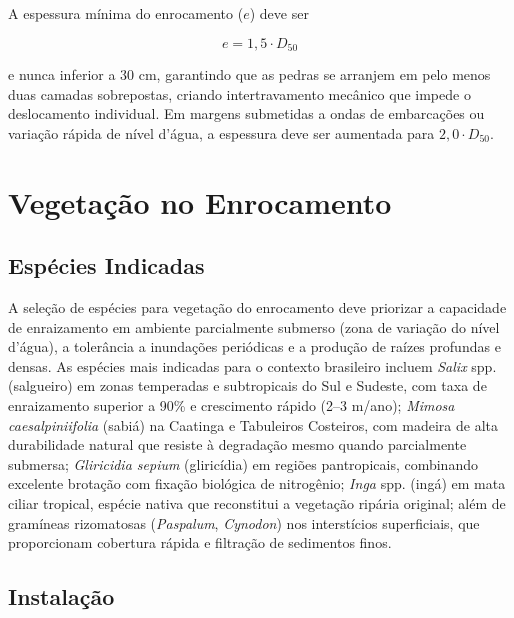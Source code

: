 \documentclass[
  portuguese,
  11pt,
  a4paper,
  open=any]{scrbook}
\begin{document}
A espessura mínima do enrocamento (\(e\)) deve ser

\[
e = 1{,}5 \cdot D_{50}
\]

e nunca inferior a 30 cm, garantindo que as pedras se arranjem em pelo
menos duas camadas sobrepostas, criando intertravamento mecânico que
impede o deslocamento individual. Em margens submetidas a ondas de
embarcações ou variação rápida de nível d'água, a espessura deve ser
aumentada para \(2{,}0 \cdot D_{50}\).

\section{Vegetação no Enrocamento}\label{vegetauxe7uxe3o-no-enrocamento}

\subsection{Espécies Indicadas}\label{espuxe9cies-indicadas}

A seleção de espécies para vegetação do enrocamento deve priorizar a
capacidade de enraizamento em ambiente parcialmente submerso (zona de
variação do nível d'água), a tolerância a inundações periódicas e a
produção de raízes profundas e densas. As espécies mais indicadas para o
contexto brasileiro incluem \emph{Salix} spp. (salgueiro) em zonas
temperadas e subtropicais do Sul e Sudeste, com taxa de enraizamento
superior a 90\% e crescimento rápido (2--3 m/ano); \emph{Mimosa
caesalpiniifolia} (sabiá) na Caatinga e Tabuleiros Costeiros, com
madeira de alta durabilidade natural que resiste à degradação mesmo
quando parcialmente submersa; \emph{Gliricidia sepium} (gliricídia) em
regiões pantropicais, combinando excelente brotação com fixação
biológica de nitrogênio; \emph{Inga} spp. (ingá) em mata ciliar
tropical, espécie nativa que reconstitui a vegetação ripária original;
além de gramíneas rizomatosas (\emph{Paspalum}, \emph{Cynodon}) nos
interstícios superficiais, que proporcionam cobertura rápida e filtração
de sedimentos finos.

\subsection{Instalação}\label{instalauxe7uxe3o-2}
\end{document}
